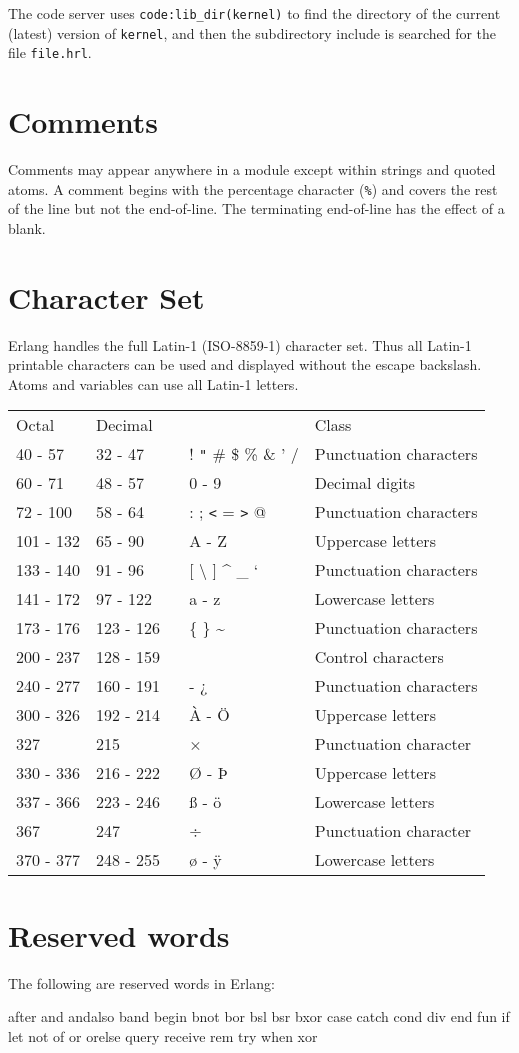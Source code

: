 The code server uses \texttt{code:lib\_dir(kernel)} to find the
directory of the current (latest) version of \texttt{kernel}, and then
the subdirectory include is searched for the file \texttt{file.hrl}.


\section{Comments}
Comments may appear anywhere in a module except within strings and
quoted atoms.  A comment begins with the percentage character
(\texttt{\%}) and covers the rest of the line but not the
end-of-line. The terminating end-of-line has the effect of a blank.


\section{Character Set}
Erlang handles the full Latin-1 (ISO-8859-1) character set. Thus all
Latin-1 printable characters can be used and displayed without the
escape backslash. Atoms and variables can use all Latin-1 letters.

\begin{center}
\begin{tabular}{|>{\raggedright}p{52pt}|>{\raggedright}p{53pt}|>{\raggedright}p{103pt}|>{\raggedright}p{87pt}|}
\hline
\multicolumn{4}{|p{297pt}|}{Character classes}\tabularnewline
\hline
Octal & Decimal~ &   & Class\tabularnewline
\hline
40 -  57 & 32 - 47 &  ! \texttt{"} \# \$ \% \& ' / & Punctuation
characters\tabularnewline
\hline
60 -  71 & 48 - 57 & 0 - 9 & Decimal digits\tabularnewline
\hline
72 - 100 & 58 - 64 & : ; \texttt{<} = \texttt{>} @ & Punctuation characters\tabularnewline
\hline
101 - 132 &  65 - 90 & A - Z & Uppercase letters\tabularnewline
\hline
133 - 140 &  91 - 96 & [ \textbackslash{} ] \textasciicircum{} \_ ` & Punctuation
characters\tabularnewline
\hline
141 - 172 &  97 - 122 & a  -  z & Lowercase letters\tabularnewline
\hline
173 - 176 & 123 - 126 & \{ \textbar{} \} \textasciitilde{} & Punctuation characters\tabularnewline
\hline
200 - 237 & 128 - 159 ~ &   & Control characters \tabularnewline
\hline
240 - 277 & 160 - 191 & - ¿  & Punctuation characters \tabularnewline
\hline
300 - 326 & 192 - 214 & À - Ö  & Uppercase letters \tabularnewline
\hline
327  & 215 & ×  & Punctuation character \tabularnewline
\hline
330 - 336 & 216 - 222 & Ø - Þ  & Uppercase letters \tabularnewline
\hline
337 - 366 & 223 - 246 & ß - ö  & Lowercase letters \tabularnewline
\hline
367  & 247 & ÷  & Punctuation character \tabularnewline
\hline
370 - 377 & 248 - 255 & ø - ÿ  & Lowercase letters \tabularnewline
\hline
\end{tabular}
\end{center}

\section{Reserved words}

\vspace{12pt}

The following are reserved words in Erlang:

\begin{erlang}
after and andalso band begin bnot bor bsl bsr bxor case catch cond
div end fun if let not of or orelse query receive rem try when xor
\end{erlang}